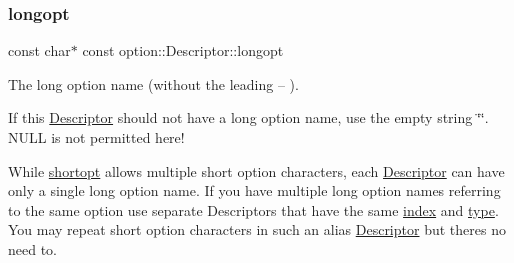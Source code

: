 \subsubsection{\texorpdfstring{longopt}{longopt}}
{\footnotesize\ttfamily const char$\ast$ const option\+::\+Descriptor\+::longopt}



The long option name (without the leading {\ttfamily --} ). 

If this \hyperlink{structoption_1_1Descriptor}{Descriptor} should not have a long option name, use the empty string \char`\"{}\char`\"{}. N\+U\+LL is not permitted here!

While \hyperlink{structoption_1_1Descriptor_a0dba4ccca59c19d6ed4081391fca5adb}{shortopt} allows multiple short option characters, each \hyperlink{structoption_1_1Descriptor}{Descriptor} can have only a single long option name. If you have multiple long option names referring to the same option use separate Descriptors that have the same \hyperlink{structoption_1_1Descriptor_a1fee8ac44f529c99ac2b1149b4c391b1}{index} and \hyperlink{structoption_1_1Descriptor_a1b220dabd8aad075fa441a80f9b9343c}{type}. You may repeat short option characters in such an alias \hyperlink{structoption_1_1Descriptor}{Descriptor} but there\textquotesingle{}s no need to.

